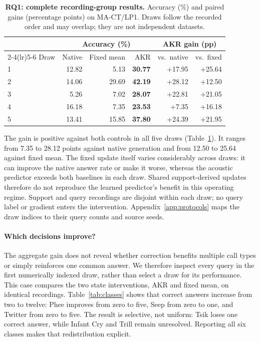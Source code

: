 \documentclass{article}
\newcommand{\method}{AKR}
\begin{document}
\begin{table}[t]
\caption{\textbf{RQ1: complete recording-group results.} Accuracy (\%) and paired gains (percentage points) on MA-CT/LP1. Draws follow the recorded order and may overlap; they are not independent datasets.}
\label{tab:draws}
\centering\small
\begin{tabular}{@{}lrrrrr@{}}
\toprule
& \multicolumn{3}{c}{Accuracy (\%)} & \multicolumn{2}{c}{AKR gain (pp)} \\
\cmidrule(lr){2-4}\cmidrule(lr){5-6}
Draw & Native & Fixed mean & \method & vs.\ native & vs.\ fixed \\
\midrule
1 & 12.82 & 5.13 & \textbf{30.77} & +17.95 & +25.64 \\
2 & 14.06 & 29.69 & \textbf{42.19} & +28.12 & +12.50 \\
3 & 5.26 & 7.02 & \textbf{28.07} & +22.81 & +21.05 \\
4 & 16.18 & 7.35 & \textbf{23.53} & +7.35 & +16.18 \\
5 & 13.41 & 15.85 & \textbf{37.80} & +24.39 & +21.95 \\
\bottomrule
\end{tabular}
\end{table}

The gain is positive against both controls in all five draws (Table~\ref{tab:draws}). It ranges from 7.35 to 28.12 points against native generation and from 12.50 to 25.64 against fixed mean. The fixed update itself varies considerably across draws: it can improve the native answer rate or make it worse, whereas the acoustic predictor exceeds both baselines in each draw. Shared support-derived updates therefore do not reproduce the learned predictor's benefit in this operating regime. Support and query recordings are disjoint within each draw; no query label or gradient enters the intervention. Appendix~\ref{app:protocols} maps the draw indices to their query counts and source seeds.


\paragraph{Which decisions improve?}
The aggregate gain does not reveal whether correction benefits multiple call types or simply reinforces one common answer. We therefore inspect every query in the first numerically indexed draw, rather than select a draw for its performance. This case compares the two state interventions, AKR and fixed mean, on identical recordings. Table~\ref{tab:classes} shows that correct answers increase from two to twelve: Phee improves from zero to five, Seep from zero to one, and Twitter from zero to five. The result is selective, not uniform: Tsik loses one correct answer, while Infant Cry and Trill remain unresolved. Reporting all six classes makes that redistribution explicit.
\end{document}
